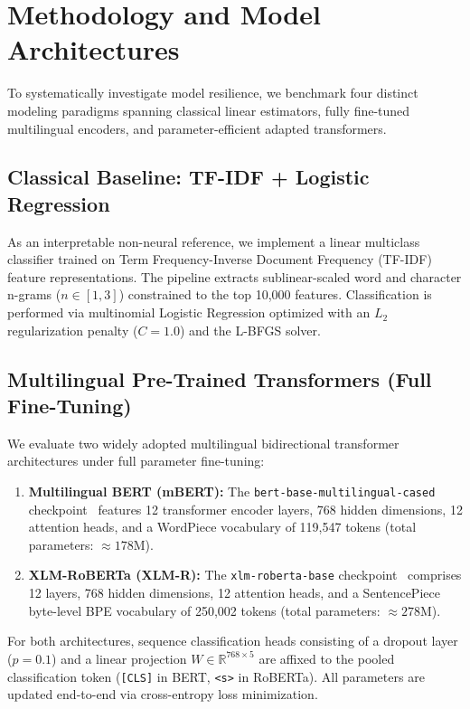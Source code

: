 \section{Methodology and Model Architectures}
\label{sec:methodology}

To systematically investigate model resilience, we benchmark four distinct modeling paradigms spanning classical linear estimators, fully fine-tuned multilingual encoders, and parameter-efficient adapted transformers.

\subsection{Classical Baseline: TF-IDF + Logistic Regression}
As an interpretable non-neural reference, we implement a linear multiclass classifier trained on Term Frequency-Inverse Document Frequency (TF-IDF) feature representations. The pipeline extracts sublinear-scaled word and character n-grams ($n \in [1, 3]$) constrained to the top 10,000 features. Classification is performed via multinomial Logistic Regression optimized with an $L_2$ regularization penalty ($C=1.0$) and the L-BFGS solver.

\subsection{Multilingual Pre-Trained Transformers (Full Fine-Tuning)}
We evaluate two widely adopted multilingual bidirectional transformer architectures under full parameter fine-tuning:
\begin{enumerate}
    \item \textbf{Multilingual BERT (\mbox{mBERT}):} The \texttt{bert-base-multilingual-cased} checkpoint~\cite{devlin2019bert} features 12 transformer encoder layers, 768 hidden dimensions, 12 attention heads, and a WordPiece vocabulary of 119,547 tokens (total parameters: $\approx 178\text{M}$).
    \item \textbf{XLM-RoBERTa (\mbox{XLM-R}):} The \texttt{xlm-roberta-base} checkpoint~\cite{conneau2020unsupervised} comprises 12 layers, 768 hidden dimensions, 12 attention heads, and a SentencePiece byte-level BPE vocabulary of 250,002 tokens (total parameters: $\approx 278\text{M}$).
\end{enumerate}
For both architectures, sequence classification heads consisting of a dropout layer ($p=0.1$) and a linear projection $W \in \mathbb{R}^{768 \times 5}$ are affixed to the pooled classification token (\texttt{[CLS]} in BERT, \texttt{<s>} in RoBERTa). All parameters are updated end-to-end via cross-entropy loss minimization.

